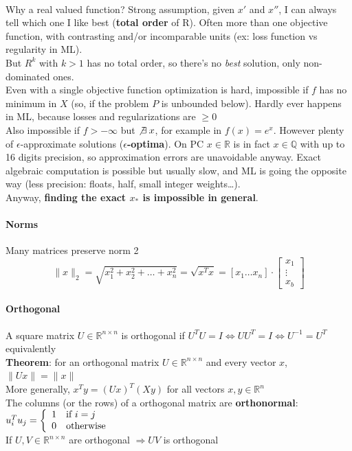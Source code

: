 \documentclass[10pt]{report}
\begin{document}
\paragraph{} Why a real valued function? Strong assumption, given $x'$ and $x''$, I can always tell which one I like best (\textbf{total order} of R). Often more than one objective function, with contrasting and/or incomparable units (ex: loss function vs regularity in ML).\\
But $R^k$ with $k > 1$ has no total order, so there's no \textit{best} solution, only non-dominated ones.\\
Even with a single objective function optimization is hard, impossible if $f$ has no minimum in $X$ (so, if the problem $P$ is unbounded below). Hardly ever happens in ML, because losses and regularizations are $\geq 0$\\
Also impossible if $f > -\infty$ but $\not\exists\:x$, for example in $f(x) = e^x$. However plenty of $\epsilon$-approximate solutions (\textbf{$\epsilon$-optima}). On PC $x\in \mathbb{R}$ is in fact $x\in \mathbb{Q}$ with up to 16 digits precision, so approximation errors are unavoidable anyway. Exact algebraic computation is possible but usually slow, and ML is going the opposite way (less precision: floats, half, small integer weights\ldots).\\
Anyway, \textbf{finding the exact $x_*$ is impossible in general}.
\paragraph{Norms} Many matrices preserve norm 2
 $$\|x\|_2 = \sqrt{x_1^2 + x_2^2 + \ldots + x_n^2} = \sqrt{x^T x} = \left[x_1 \ldots x_n\right]\cdot\left[\begin{array}{c}
	x_1\\\vdots\\x_b
	\end{array}\right]$$
\paragraph{Orthogonal} A square matrix $U\in \mathbb{R}^{n\times n}$ is orthogonal if $U^TU = I \Leftrightarrow UU^T = I \Leftrightarrow U^{-1} = U^T$ equivalently\\
\textbf{Theorem}: for an orthogonal matrix $U\in \mathbb{R}^{n\times n}$ and every vector $x$, $\|Ux\| = \|x\|$\\
More generally, $x^T y = (Ux)^T(Xy)$ for all vectors $x,y\in \mathbb{R}^n$\\
The columns (or the rows) of a orthogonal matrix are \textbf{orthonormal}: $u_i^Tu_j = \left\{\begin{array}{l l}
1 &\text{if } i = j\\0&\text{otherwise}
\end{array}\right.$\\
If $U,V\in \mathbb{R}^{n\times n}$ are orthogonal $\Rightarrow UV$ is orthogonal
\end{document}

